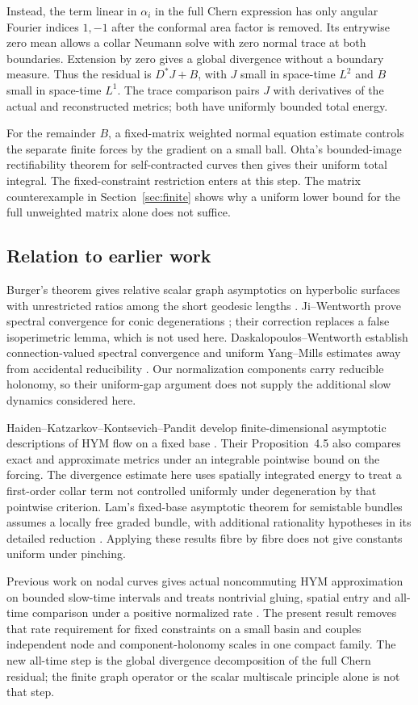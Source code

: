 Instead, the term linear in $\alpha_i$ in the full Chern
expression has only angular Fourier indices $1,-1$ after
the conformal area factor is removed. Its entrywise zero
mean allows a collar Neumann solve with zero normal trace
at both boundaries. Extension by zero gives a global
divergence without a boundary measure. Thus the residual is
$D^*J+B$, with $J$ small in space-time $L^2$ and $B$ small
in space-time $L^1$. The trace comparison pairs $J$ with
derivatives of the actual and reconstructed metrics; both
have uniformly bounded total energy.

For the remainder $B$, a fixed-matrix weighted normal
equation estimate controls the separate finite forces by
the gradient on a small ball. Ohta's bounded-image
rectifiability theorem for self-contracted curves
\cite{ohta} then gives their uniform total integral.
The fixed-constraint restriction enters at this step.
The matrix counterexample in Section~\ref{sec:finite}
shows why a uniform lower bound for the full unweighted
matrix alone does not suffice.

\subsection{Relation to earlier work}
Burger's theorem gives relative scalar graph asymptotics
on hyperbolic surfaces with unrestricted ratios among
the short geodesic lengths \cite{burger}. Ji--Wentworth
prove spectral convergence for conic degenerations
\cite{ji-wentworth,ji-wentworth-correction}; their
correction replaces a false isoperimetric lemma, which
is not used here. Daskalopoulos--Wentworth establish
connection-valued spectral convergence and uniform
Yang--Mills estimates away from accidental reducibility
\cite[Theorem~4.13, Corollary~4.14 and
Proposition~5.8]{dw}. Our normalization components carry
reducible holonomy, so their uniform-gap argument does
not supply the additional slow dynamics considered here.

Haiden--Katzarkov--Kontsevich--Pandit develop
finite-dimensional asymptotic descriptions of HYM flow
on a fixed base \cite{hkkp}. Their Proposition~4.5
also compares exact and approximate metrics under an
integrable pointwise bound on the forcing. The
divergence estimate here uses spatially integrated
energy to treat a first-order collar term not controlled
uniformly under degeneration by that pointwise criterion.
Lam's fixed-base asymptotic
theorem for semistable bundles assumes a locally free
graded bundle, with additional rationality hypotheses
in its detailed reduction \cite{lam}. Applying these
results fibre by fibre does not give constants uniform
under pinching.

Previous work on nodal curves gives actual
noncommuting HYM approximation on bounded slow-time
intervals \cite{wuebben-effective} and treats
nontrivial gluing, spatial entry and all-time
comparison under a positive normalized rate
\cite{wuebben-gluing}. The present result removes
that rate requirement for fixed constraints on a
small basin and couples independent node and
component-holonomy scales in one compact family.
The new all-time step is the global divergence
decomposition of the full Chern residual; the
finite graph operator or the scalar multiscale
principle alone is not that step.
